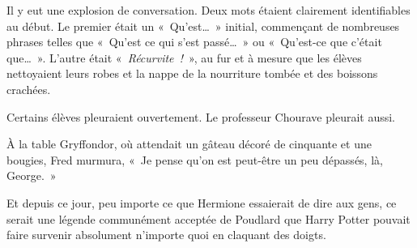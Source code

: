 Il y eut une explosion de conversation. Deux mots étaient clairement identifiables au début. Le premier était un «~Qu'est…~» initial, commençant de nombreuses phrases telles que «~Qu'est ce qui s'est passé…~» ou «~Qu'est-ce que c'était que…~». L'autre était «~\emph{Récurvite~!}~», au fur et à mesure que les élèves nettoyaient leurs robes et la nappe de la nourriture tombée et des boissons crachées.

Certains élèves pleuraient ouvertement. Le professeur Chourave pleurait aussi.

À la table Gryffondor, où attendait un gâteau décoré de cinquante et une bougies, Fred murmura, «~Je pense qu'on est peut-être un peu dépassés, là, George.~»

Et depuis ce jour, peu importe ce que Hermione essaierait de dire aux gens, ce serait une légende communément acceptée de Poudlard que Harry Potter pouvait faire survenir absolument n'importe quoi en claquant des doigts.~
